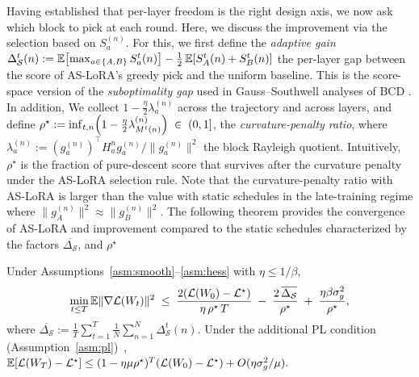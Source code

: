 Having established that per-layer freedom is the right design axis, we now ask which block to pick at each round. Here, we discuss the improvement via the selection based on $S_a^{(n)}$. For this, we first define the \emph{adaptive gain} $\Delta_{\mathcal S}^t(n) := \mathbb{E}\!\left[\max_{a\in\{A,B\}} S_a^t (n)\right] -\frac{1}{2}\,\mathbb{E}\!\left[S_A^{t}(n)+S_B^{t}(n)\right] $
the per-layer gap between the score of AS-LoRA's greedy pick and the uniform baseline. This is the score-space version of the \emph{suboptimality gap} used in Gauss--Southwell analyses of BCD \cite{nesterov2012bcd}. In addition, We collect $1-\tfrac{\eta}{2}\lambda_a^{(n)}$ across the trajectory and across layers, and define $\rho^\star := \inf_{t,n}\Bigl(1-\tfrac{\eta}{2}\lambda_{M^t(n)}^{(n)}\Bigr) \;\in\;(0,1]$,
the \emph{curvature-penalty ratio}, where $\lambda_{a}^{(n)}:=(g_{a}^{(n)})^{\top} H_a^{n} g_a^{(n)}/\|g_a^{(n)}\|^2$ the block Rayleigh quotient. Intuitively, $\rho^\star$ is the fraction of pure-descent score that survives after the curvature penalty under the AS-LoRA selection rule. Note that the curvature-penalty ratio with AS-LoRA is larger than the value with static schedules in the late-training regime where $\|g_A^{(n)}\|^2 \approx \|g_B^{(n)}\|^2$. The following theorem provides the convergence of AS-LoRA and improvement compared to the static schedules characterized by the factors $\overline{\Delta_{\mathcal S}}$, and $\rho^\star$   
\begin{theorem}\label{thm:conv}
Under Assumptions~\ref{asm:smooth}--\ref{asm:hess} with $\eta\le 1/\beta$,
\begin{equation} \label{non-convex_bound}
\min_{t\le T}\mathbb{E}\|\nabla\mathcal{L}(W_t)\|^2 \;\le\; \frac{2(\mathcal{L}(W_0)-\mathcal{L}^\star)}{\eta\,\rho^\star\,T} \;-\; \frac{2\,\overline{\Delta_{\mathcal S}}}{\rho^\star} \;+\; \frac{\eta\beta\sigma_g^2}{\rho^\star},    
\end{equation}
where $\overline{\Delta_{\mathcal S}}:=\tfrac{1}{T}\sum_{t=1}^{T}\tfrac{1}{N}\sum_{n=1}^{N}\Delta_{\mathcal S}^t(n)$. Under the additional PL condition (Assumption~\ref{asm:pl})~\citep{karimi2016pl},
$
\mathbb{E}[\mathcal{L}(W_T)-\mathcal{L}^\star]\le(1-\eta\mu\rho^\star)^T(\mathcal{L}(W_0)-\mathcal{L}^\star)+O(\eta\sigma_g^2/\mu).
$
\end{theorem}

